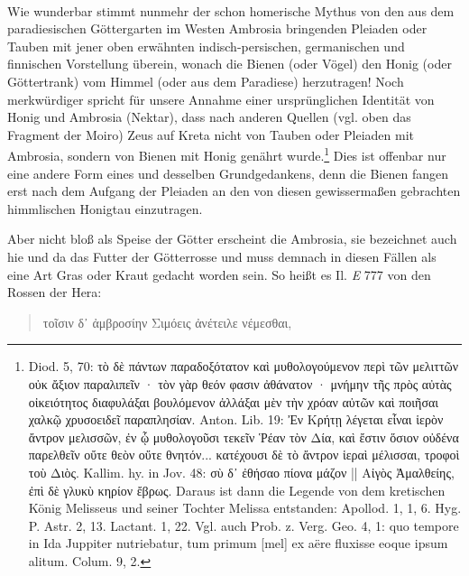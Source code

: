 \documentclass[a4paper, 11pt, oneside]{article}
\begin{document}
\paragraph{}
Wie wunderbar stimmt nunmehr der schon homerische Mythus von den aus dem paradiesischen Göttergarten im Westen Ambrosia bringenden Pleiaden oder Tauben mit jener oben erwähnten indisch-persischen, germanischen und finnischen Vorstellung überein, wonach die Bienen (oder Vögel) den Honig (oder Göttertrank) vom Himmel (oder aus dem Paradiese) herzutragen! Noch merkwürdiger spricht für unsere Annahme einer ursprünglichen Identität von Honig und Ambrosia (Nektar), dass nach anderen Quellen (vgl. oben das Fragment der Moiro) Zeus auf Kreta nicht von Tauben oder Pleiaden mit Ambrosia, sondern von Bienen mit Honig genährt wurde.\footnote{Diod. 5, 70: τὸ δὲ πάντων παραδοξότατον καὶ μυθολογούμενον περὶ τῶν μελιττῶν οὐκ ἄξιον παραλιπεῖν · τὸν γὰρ θεόν φασιν ἀθάνατον · μνήμην τῆς πρὸς αὐτὰς οἰκειότητος διαφυλάξαι βουλόμενον ἀλλάξαι μὲν τὴν χρόαν αὐτῶν καὶ ποιῆσαι χαλκῷ χρυσοειδεῖ παραπλησίαν. Anton. Lib. 19: Ἐν Κρήτῃ λέγεται εἶναι ἱερὸν ἄντρον μελισσῶν, ἐν ᾧ μυθολογοῦσι τεκεῖν Ῥέαν τὸν Δία, καὶ ἔστιν ὅσιον οὐδένα παρελθεῖν οὔτε θεὸν οὔτε θνητόν... κατέχουσι δὲ τὸ ἄντρον ἱεραὶ μέλισσαι, τροφοὶ τοὺ Διὸς. Kallim. hy. in Jov. 48: σὺ δ᾽ ἐθήσαο πίονα μάζον || Αἰγὸς Ἀμαλθείης, ἐπὶ δὲ γλυκὺ κηρίον ἔβρως. Daraus ist dann die Legende von dem kretischen König Melisseus und seiner Tochter Melissa entstanden: Apollod. 1, 1, 6. Hyg. P. Astr. 2, 13. Lactant. 1, 22. Vgl. auch Prob. z. Verg. Geo. 4, 1: quo tempore in Ida Juppiter nutriebatur, tum primum [mel] ex aëre fluxisse eoque ipsum alitum. Colum. 9, 2.} Dies ist offenbar nur eine andere Form eines und desselben Grundgedankens, denn die Bienen fangen erst nach dem Aufgang der Pleiaden an den von diesen gewissermaßen gebrachten himmlischen Honigtau einzutragen.

Aber nicht bloß als Speise der Götter erscheint die Ambrosia, sie bezeichnet auch hie und da das Futter der Götterrosse und muss demnach in diesen Fällen als eine Art Gras oder Kraut gedacht worden sein. So heißt es Il. \emph{E} 777 von den Rossen der Hera:
\begin{quotation}
τοῖσιν δ᾽ ἀμβροσίην Σιμόεις ἀνέτειλε νέμεσθαι,
\end{quotation}
\end{document}
